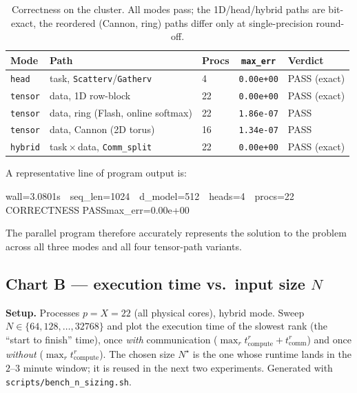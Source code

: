 \documentclass[11pt,a4paper]{article}
\newcommand{\code}[1]{\texttt{#1}}
\begin{document}
\begin{table}[H]
\centering\small
\caption{Correctness on the cluster. All modes pass; the 1D/head/hybrid paths are
bit-exact, the reordered (Cannon, ring) paths differ only at single-precision
round-off.}\label{tab:correct}
\begin{tabular}{@{}lllcl@{}}
\toprule
Mode & Path & Procs & \code{max\_err} & Verdict \\
\midrule
\code{head}   & task, \code{Scatterv}/\code{Gatherv}       & 4  & \code{0.00e+00} & PASS (exact) \\
\code{tensor} & data, 1D row-block                          & 22 & \code{0.00e+00} & PASS (exact) \\
\code{tensor} & data, ring (Flash, online softmax)          & 22 & \code{1.86e-07} & PASS \\
\code{tensor} & data, Cannon (2D torus)                     & 16 & \code{1.34e-07} & PASS \\
\code{hybrid} & task\,$\times$\,data, \code{Comm\_split}    & 22 & \code{0.00e+00} & PASS (exact) \\
\bottomrule
\end{tabular}
\end{table}

\noindent
A representative line of program output is:
\begin{center}\small\ttfamily
[HYBRID] wall=3.0801s\ \ seq\_len=1024\ \ d\_model=512\ \ heads=4\ \ procs=22\\
CORRECTNESS PASS\quad max\_err=0.00e+00
\end{center}
\noindent
The parallel program therefore accurately represents the solution to the problem
across all three modes and all four tensor-path variants.

\subsection{Chart B --- execution time vs.\ input size $N$}
\label{sec:chartb}
\textbf{Setup.} Processes $p=X=22$ (all physical cores), hybrid mode. Sweep
$N\in\{64,128,\dots,32768\}$ and plot the execution time of the slowest rank
(the ``start to finish'' time), once \emph{with} communication
($\max_r t^r_{\text{compute}}+t^r_{\text{comm}}$) and once \emph{without}
($\max_r t^r_{\text{compute}}$). The chosen size $N^{\star}$ is the one whose
runtime lands in the $2$--$3$ minute window; it is reused in the next two
experiments. Generated with \code{scripts/bench\_n\_sizing.sh}.
\end{document}
